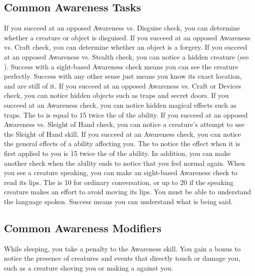  \subsection{Common Awareness Tasks}

     If you succeed at an opposed Awareness vs. Disguise check, you can determine whether a creature or object is disguised.
     If you succeed at an opposed Awareness vs. Craft check, you can determine whether an object is a forgery.
     If you succeed at an opposed Awareness vs. Stealth check, you can notice a hidden creature (see ).
    Success with a sight-based Awareness check means you can see the creature perfectly.
    Success with any other sense just means you know its exact location, and are still \partiallyunaware of it.
     If you succeed at an opposed Awareness vs. Craft or Devices check, you can notice hidden objects such as traps and secret doors.
     If you succeed at an Awareness check, you can notice hidden magical effects such as traps.
    The  to is equal to 15 \add twice the  of the ability.
     If you succeed at an opposed Awareness vs. Sleight of Hand check, you can notice a creature's attempt to use the Sleight of Hand skill.
     If you succeed at an Awareness check, you can notice the general effects of a  ability affecting you.
    The  to notice the effect when it is first applied to you is 15 \add twice the  of the ability.
    In addition, you can make another check when the ability ends to notice that you feel normal again.
     When you see a creature speaking, you can make an sight-based Awareness check to read its lips.
    The  is 10 for ordinary conversation, or up to 20 if the speaking creature makes an effort to avoid moving its lips.
    You must be able to understand the language spoken.
    Success means you can understand what is being said.

  \subsection{Common Awareness Modifiers}\label{Common Awareness Modifiers}
    While sleeping, you take a  penalty to the Awareness skill.
    You gain a  bonus to notice the presence of creatures and events that directly touch or damage you, such as a creature shoving you or making a  against you.

